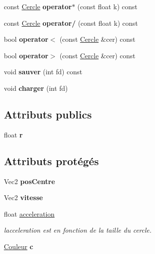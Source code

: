 \begin{DoxyCompactItemize}
const \mbox{\hyperlink{class_cercle}{Cercle}} {\bfseries operator$\ast$} (const float k) const
\item 
\mbox{\label{class_cercle_a811d4d4b8f0005724057be5ca1011e7f}} 
const \mbox{\hyperlink{class_cercle}{Cercle}} {\bfseries operator/} (const float k) const
\item 
\mbox{\label{class_cercle_ac693f7261ef7e51be7233e344dec6207}} 
bool {\bfseries operator$<$} (const \mbox{\hyperlink{class_cercle}{Cercle}} \&cer) const
\item 
\mbox{\label{class_cercle_acc2ac83f573a1662ba2d702fbf613ac1}} 
bool {\bfseries operator$>$} (const \mbox{\hyperlink{class_cercle}{Cercle}} \&cer) const
\item 
\mbox{\label{class_cercle_a9c47af870d3b2a3b3f85eeeeac614650}} 
void {\bfseries sauver} (int fd) const
\item 
\mbox{\label{class_cercle_afeed85e86b9ee3bc82d7ffa776df0d97}} 
void {\bfseries charger} (int fd)
\end{DoxyCompactItemize}
\subsection*{Attributs publics}
\begin{DoxyCompactItemize}
\item 
\mbox{\label{class_cercle_ac8e752d81d87ebdf2045d91a1c84b1c9}} 
float {\bfseries r}
\end{DoxyCompactItemize}
\subsection*{Attributs protégés}
\begin{DoxyCompactItemize}
\item 
\mbox{\label{class_cercle_a2536fa5ad3d48560c79738d8627562e6}} 
Vec2 {\bfseries pos\+Centre}
\item 
\mbox{\label{class_cercle_a419bb5b8f27505e1ef7756825e83f032}} 
Vec2 {\bfseries vitesse}
\item 
\mbox{\label{class_cercle_a204c332a741af2ec003f7ccfc9d6abdc}} 
float \mbox{\hyperlink{class_cercle_a204c332a741af2ec003f7ccfc9d6abdc}{acceleration}}
\begin{DoxyCompactList}\small\item\em l\textquotesingle{}acceleration est en fonction de la taille du cercle. \end{DoxyCompactList}\item 
\mbox{\label{class_cercle_acc71e6819944ae748c392d6cacc10f9e}} 
\mbox{\hyperlink{class_couleur}{Couleur}} {\bfseries c}
\end{DoxyCompactItemize}
